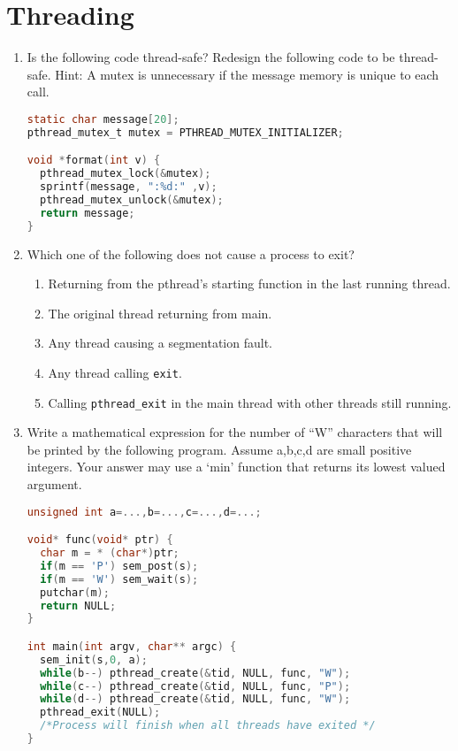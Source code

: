 \section{Threading}

\begin{enumerate}

\item Is the following code thread-safe? Redesign the following code to be thread-safe. Hint: A mutex is unnecessary if the message memory is unique to each call.

\begin{lstlisting}[language=C]
static char message[20];
pthread_mutex_t mutex = PTHREAD_MUTEX_INITIALIZER;

void *format(int v) {
  pthread_mutex_lock(&mutex);
  sprintf(message, ":%d:" ,v);
  pthread_mutex_unlock(&mutex);
  return message;
}
\end{lstlisting}

\item Which one of the following does not cause a process to exit?

\begin{enumerate}
\item Returning from the pthread's starting function in the last running thread.
\item The original thread returning from main.
\item Any thread causing a segmentation fault.
\item Any thread calling \texttt{exit}.
\item Calling \texttt{pthread\_exit} in the main thread with other threads still running.
\end{enumerate}

\item Write a mathematical expression for the number of ``W'' characters that will be printed by the following program. Assume a,b,c,d are small positive integers. Your answer may use a `min' function that returns its lowest valued argument.

\begin{lstlisting}[language=C]
unsigned int a=...,b=...,c=...,d=...;

void* func(void* ptr) {
  char m = * (char*)ptr;
  if(m == 'P') sem_post(s);
  if(m == 'W') sem_wait(s);
  putchar(m);
  return NULL;
}

int main(int argv, char** argc) {
  sem_init(s,0, a);
  while(b--) pthread_create(&tid, NULL, func, "W");
  while(c--) pthread_create(&tid, NULL, func, "P");
  while(d--) pthread_create(&tid, NULL, func, "W");
  pthread_exit(NULL);
  /*Process will finish when all threads have exited */
}
\end{lstlisting}


\end{enumerate}
